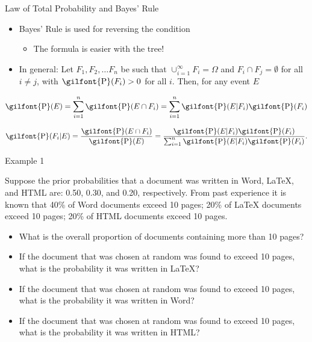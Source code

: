 \documentclass[
  ignorenonframetext,
]{beamer}
\providecommand{\tightlist}{%
  \setlength{\itemsep}{0pt}\setlength{\parskip}{0pt}}
\begin{document}
\begin{frame}{Law of Total Probability and Bayes' Rule}
\protect\hypertarget{law-of-total-probability-and-bayes-rule-1}{}
\begin{itemize}
\item
  Bayes' Rule is used for reversing the condition

  \begin{itemize}
  \tightlist
  \item
    The formula is easier with the tree!
  \end{itemize}
\item
  In general: Let \(F_1, F_2, \ldots F_n\) be such that
  \(\cup_{i=1}^{\infty} F_i=\Omega\) and \(F_i\cap F_j=\emptyset\) for
  all \(i\neq j\), with \(\textrm{\gilfont{P}}\normalfont (F_i)>0\) for
  all \(i\). Then, for any event \(E\)
\end{itemize}

\[\textrm{\gilfont{P}}\normalfont (E)=\sum_{i=1}^n \textrm{\gilfont{P}}\normalfont (E \cap F_i)=\sum_{i=1}^n \textrm{\gilfont{P}}\normalfont (E|F_i)\textrm{\gilfont{P}}\normalfont (F_i)\]

\[\textrm{\gilfont{P}}\normalfont (F_i|E)=\frac{\textrm{\gilfont{P}}\normalfont (E \cap F_i)}{\textrm{\gilfont{P}}\normalfont (E)}=\frac{\textrm{\gilfont{P}}\normalfont (E|F_i)\textrm{\gilfont{P}}\normalfont (F_i)}{\sum_{i=1}^n\textrm{\gilfont{P}}\normalfont (E|F_i)\textrm{\gilfont{P}}\normalfont (F_i)}.\]
\end{frame}

\begin{frame}{Example 1}
\protect\hypertarget{example-1-1}{}
\begin{tcolorbox}
Suppose the prior probabilities that a document was written in Word, LaTeX, and HTML are: 0.50, 0.30, and 0.20, respectively.  From past experience it is known that 40\% of Word documents exceed 10 pages; 20\% of LaTeX documents exceed 10 pages; 20\% of HTML documents exceed 10 pages.  

\begin{itemize}
\item What is the overall proportion of documents containing more than 10 pages?
\item If the document that was chosen at random was found to exceed 10 pages, what is the probability it was written in LaTeX?
\item If the document that was chosen at random was found to exceed 10 pages, what is the probability it was written in Word?
\item If the document that was chosen at random was found to exceed 10 pages, what is the probability it was written in HTML?
\end{itemize}

\end{tcolorbox}
\end{frame}
\end{document}
